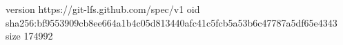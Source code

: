 version https://git-lfs.github.com/spec/v1
oid sha256:bf9553909cb8ee664a1b4c05d813440afc41c5fcb5a53b6c47787a5df65e4343
size 174992

